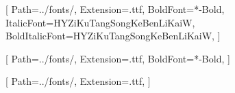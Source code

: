 [%
    Path=../fonts/,
    Extension=.ttf,
    BoldFont=*-Bold,
    ItalicFont=HYZiKuTangSongKeBenLiKaiW,
    BoldItalicFont=HYZiKuTangSongKeBenLiKaiW,
]

[%
    Path=../fonts/,
    Extension=.ttf,
    BoldFont=*-Bold,
]

[
    Path=../fonts/,
    Extension=.ttf,
]
